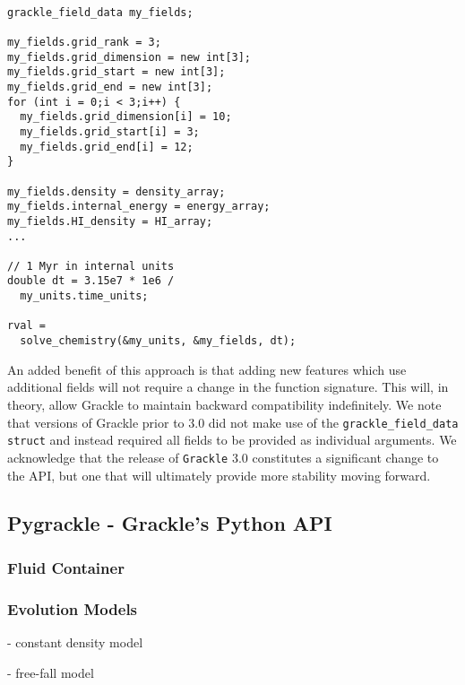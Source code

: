 \vspace{0.5cm}
\begin{minipage}[b]{0.5\linewidth}
\begin{verbatim}

grackle_field_data my_fields;

my_fields.grid_rank = 3;
my_fields.grid_dimension = new int[3];
my_fields.grid_start = new int[3];
my_fields.grid_end = new int[3];
for (int i = 0;i < 3;i++) {
  my_fields.grid_dimension[i] = 10;
  my_fields.grid_start[i] = 3;
  my_fields.grid_end[i] = 12;
}

my_fields.density = density_array;
my_fields.internal_energy = energy_array;
my_fields.HI_density = HI_array;
...

// 1 Myr in internal units
double dt = 3.15e7 * 1e6 /
  my_units.time_units;

rval =
  solve_chemistry(&my_units, &my_fields, dt);

\end{verbatim}
\end{minipage}

An added benefit of this approach is that adding new
features which use additional fields will not require a change in the
function signature.  This will, in theory, allow Grackle to maintain
backward compatibility indefinitely.  We note that versions of Grackle
prior to 3.0 did not make use of the \texttt{grackle\_field\_data}
\texttt{struct} and instead required all fields to be provided as
individual arguments.  We acknowledge that the release of
\texttt{Grackle} 3.0 constitutes a significant change to the API, but
one that will ultimately provide more stability moving forward.

\subsection{Pygrackle - Grackle's Python API}

\subsubsection{Fluid Container} \label{sec:pyfluid}

\subsubsection{Evolution Models} \label{sec:pyevolve}

- constant density model

- free-fall model

